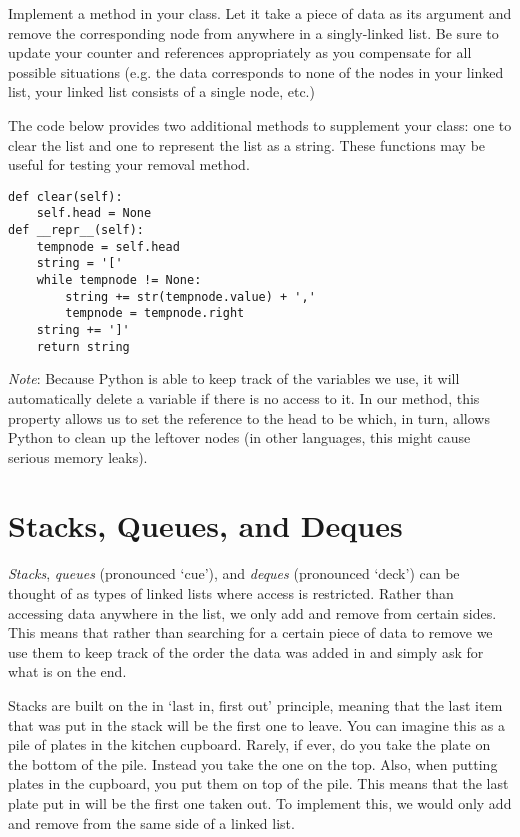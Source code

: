 \begin{problem}
Implement a  method in your  class.
Let it take a piece of data as its argument and remove the corresponding node from anywhere in a singly-linked list.
Be sure to update your counter and references appropriately as you compensate for all possible situations (e.g. the data corresponds to none of the nodes in your linked list, your linked list consists of a single node, etc.)

The code below provides two additional methods to supplement your  class: one to clear the list and one to represent the list as a string.
These functions may be useful for testing your removal method.
\begin{lstlisting}
def clear(self):
    self.head = None
def __repr__(self):
    tempnode = self.head
    string = '['
    while tempnode != None:
        string += str(tempnode.value) + ','
        tempnode = tempnode.right
    string += ']'
    return string
\end{lstlisting}
\label{prob:LinkedLists}
\emph{Note}: Because Python is able to keep track of the variables we use, it will automatically delete a variable if there is no access to it.
In our  method, this property allows us to set the reference to the head to be  which, in turn, allows Python to clean up the leftover nodes (in other languages, this might cause serious memory leaks).

\end{problem}

\section*{Stacks, Queues, and Deques}
\emph{Stacks}, \emph{queues} (pronounced `cue'), and \emph{deques} (pronounced `deck') can be thought of as types of linked lists where access is restricted.
Rather than accessing data anywhere in the list, we only add and remove from certain sides.
This means that rather than searching for a certain piece of data to remove we use them to keep track of the order the data was added in and simply ask for what is on the end.

Stacks are built on the in `last in, first out' principle, meaning that the last item that was put in the stack will be the first one to leave.
You can imagine this as a pile of plates in the kitchen cupboard. Rarely, if ever, do you take the plate on the bottom of the pile.
Instead you take the one on the top. Also, when putting plates in the cupboard, you put them on top of the pile.
This means that the last plate put in will be the first one taken out.
To implement this, we would only add and remove from the same side of a linked list.

